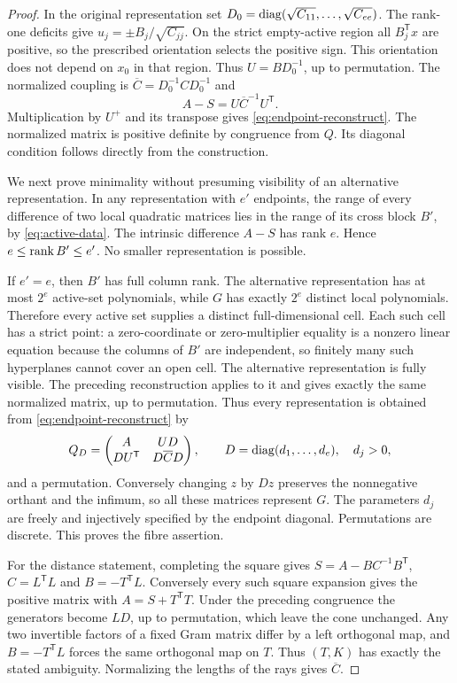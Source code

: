 \begin{proof}
In the original representation set $D_0=\operatorname{diag}(\sqrt{C_{11}},\ldots,\sqrt{C_{ee}})$. The rank-one deficits give $u_j=\pm B_j/\sqrt{C_{jj}}$. On the strict empty-active region all $B_j^{\mathsf T}x$ are positive, so the prescribed orientation selects the positive sign. This orientation does not depend on $x_0$ in that region. Thus $U=BD_0^{-1}$, up to permutation. The normalized coupling is $\overline C=D_0^{-1}CD_0^{-1}$ and
\[
 A-S=U\overline C^{-1}U^{\mathsf T}.
\]
Multiplication by $U^+$ and its transpose gives \eqref{eq:endpoint-reconstruct}. The normalized matrix is positive definite by congruence from $Q$. Its diagonal condition follows directly from the construction.

We next prove minimality without presuming visibility of an alternative representation. In any representation with $e'$ endpoints, the range of every difference of two local quadratic matrices lies in the range of its cross block $B'$, by \eqref{eq:active-data}. The intrinsic difference $A-S$ has rank $e$. Hence $e\le\operatorname{rank} B'\le e'$. No smaller representation is possible.

If $e'=e$, then $B'$ has full column rank. The alternative representation has at most $2^e$ active-set polynomials, while $G$ has exactly $2^e$ distinct local polynomials. Therefore every active set supplies a distinct full-dimensional cell. Each such cell has a strict point: a zero-coordinate or zero-multiplier equality is a nonzero linear equation because the columns of $B'$ are independent, so finitely many such hyperplanes cannot cover an open cell. The alternative representation is fully visible. The preceding reconstruction applies to it and gives exactly the same normalized matrix, up to permutation. Thus every representation is obtained from \eqref{eq:endpoint-reconstruct} by
\[
 Q_D=\begin{pmatrix}A&UD\\DU^{\mathsf T}&D\overline C D\end{pmatrix},
 \qquad D=\operatorname{diag}(d_1,\ldots,d_e),\quad d_j>0,
\]
and a permutation. Conversely changing $z$ by $Dz$ preserves the nonnegative orthant and the infimum, so all these matrices represent $G$. The parameters $d_j$ are freely and injectively specified by the endpoint diagonal. Permutations are discrete. This proves the fibre assertion.

For the distance statement, completing the square gives
$S=A-BC^{-1}B^{\mathsf T}$, $C=L^{\mathsf T}L$ and
$B=-T^{\mathsf T}L$. Conversely every such square expansion gives the positive matrix with $A=S+T^{\mathsf T}T$. Under the preceding congruence the generators become $LD$, up to permutation, which leave the cone unchanged. Any two invertible factors of a fixed Gram matrix differ by a left orthogonal map, and $B=-T^{\mathsf T}L$ forces the same orthogonal map on $T$. Thus $(T,K)$ has exactly the stated ambiguity. Normalizing the lengths of the rays gives $\overline C$.
\end{proof}

